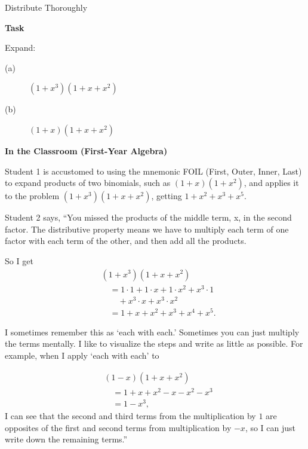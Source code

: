 \TriExample
  {Distribute Thoroughly}
  {
    \textbf{Task}

    Expand:

    \begin{description}
      \item [\normalfont (a)] $(1 + x^3)(1 + x + x^2)$
      \item [\normalfont (b)] $(1 + x)(1 + x + x^2)$
    \end{description}\vspace{.25\baselineskip}

    \textbf{In the Classroom (First-Year Algebra)}

    Student 1 is accustomed to using the mnemonic FOIL (First, Outer, Inner, Last) to expand products of two binomials, such as $(1 + x)(1 + x^2)$, and applies it to the problem $(1 + x^3)(1 + x + x^2)$, getting $1 + x^2 + x^3 + x^5$.\vspace{\baselineskip}

    Student 2 says, ``You missed the products of the middle term, x, in the second factor. The distributive property means we have to multiply each term of one factor with each term of the other, and then add all the products.

    So I get
    $$
    \begin{aligned}
      &(1 + x^3)(1 + x + x^2) \\ 
        &\quad= 1 \cdot 1 + 1 \cdot x + 1 \cdot x^2 + x^3 \cdot 1\\
        &\qquad + x^3 \cdot x + x^3 \cdot x^2 \\
        &\quad= 1 + x + x^2 + x^3 + x^4 + x^5.
    \end{aligned}
    $$

    I sometimes remember this as `each with each.' Sometimes you can just multiply the terms mentally. I like to visualize the steps and write as little as possible. For example, when I apply `each with each' to\vspace{\baselineskip}

    $$
    \begin{aligned}
      &(1 - x)(1 + x + x^2) \\
      &\quad = 1 + x + x^2 - x - x^2 - x^3 \\
      &\quad = 1 - x^3,
    \end{aligned}
    $$
    I can see that the second and third terms from the multiplication by $1$ are opposites of the first and second terms from multiplication by $-x$, so I can just write down the remaining terms.''

}
